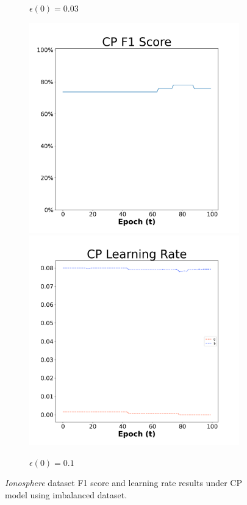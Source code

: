 \begin{figure}[H]
\begin{subfigure}{0.3\textwidth}
  \caption{$\epsilon(0)=0.03$}
\end{subfigure}\hfil %
\begin{subfigure}{0.3\textwidth}
  \includegraphics[width=\linewidth]{images/exper2/Ionosphere/CP_0.1_f1.png}
  \includegraphics[width=\linewidth]{images/exper2/Ionosphere/CP_0.1_lr.png}
  \caption{$\epsilon(0)=0.1$}
\end{subfigure}

\caption{\textit{Ionosphere} dataset F1 score and learning rate results under CP model using imbalanced dataset.}
\end{figure}


